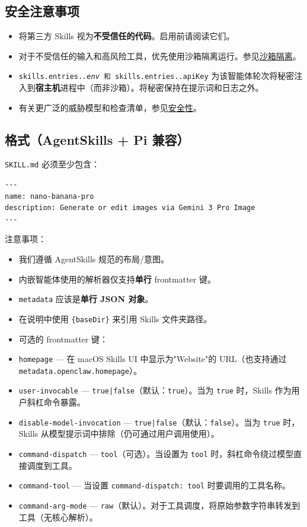 \subsection{安全注意事项}


\begin{itemize}
  \item 将第三方 Skills 视为\textbf{不受信任的代码}。启用前请阅读它们。
  \item 对于不受信任的输入和高风险工具，优先使用沙箱隔离运行。参见\href{/gateway/sandboxing}{沙箱隔离}。
  \item \texttt{skills.entries.\textit{.env} 和 \texttt{skills.entries.}.apiKey} 为该智能体轮次将秘密注入到\textbf{宿主机}进程中（而非沙箱）。将秘密保持在提示词和日志之外。
  \item 有关更广泛的威胁模型和检查清单，参见\href{/gateway/security}{安全性}。
\end{itemize}


\subsection{格式（AgentSkills + Pi 兼容）}


\texttt{SKILL.md} 必须至少包含：

\begin{lstlisting}
---
name: nano-banana-pro
description: Generate or edit images via Gemini 3 Pro Image
---
\end{lstlisting}


注意事项：

\begin{itemize}
  \item 我们遵循 AgentSkills 规范的布局/意图。
  \item 内嵌智能体使用的解析器仅支持\textbf{单行} frontmatter 键。
  \item \texttt{metadata} 应该是\textbf{单行 JSON 对象}。
  \item 在说明中使用 \texttt{\{baseDir\}} 来引用 Skills 文件夹路径。
  \item 可选的 frontmatter 键：
  \item \texttt{homepage} — 在 macOS Skills UI 中显示为"Website"的 URL（也支持通过 \texttt{metadata.openclaw.homepage}）。
  \item \texttt{user-invocable} — \texttt{true|false}（默认：\texttt{true}）。当为 \texttt{true} 时，Skills 作为用户斜杠命令暴露。
  \item \texttt{disable-model-invocation} — \texttt{true|false}（默认：\texttt{false}）。当为 \texttt{true} 时，Skills 从模型提示词中排除（仍可通过用户调用使用）。
  \item \texttt{command-dispatch} — \texttt{tool}（可选）。当设置为 \texttt{tool} 时，斜杠命令绕过模型直接调度到工具。
  \item \texttt{command-tool} — 当设置 \texttt{command-dispatch: tool} 时要调用的工具名称。
  \item \texttt{command-arg-mode} — \texttt{raw}（默认）。对于工具调度，将原始参数字符串转发到工具（无核心解析）。
\end{itemize}


